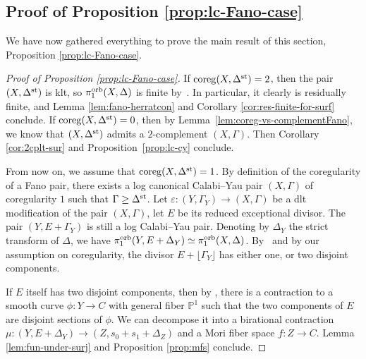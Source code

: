 \documentclass{amsart}
\newcommand{\pp}{\mathbb{P}}
\theoremstyle{definition}
\theoremstyle{remark}
\numberwithin{equation}{section}
\begin{document}
\subsection{Proof of Proposition \ref{prop:lc-Fano-case}}\label{subsec:lc-Fano-surf}
We have now gathered everything to prove the main result of this section, Proposition \ref{prop:lc-Fano-case}.


\begin{proof}[Proof of Proposition \ref{prop:lc-Fano-case}]
If ${\rm coreg}(X,\Delta^{\rm st})=2$, then the pair $(X,\Delta^{\rm st})$ is klt, so $\pi_1^{\rm orb}(X,\Delta)$ is finite by~\cite[Theorem 2]{Bra20}. In particular, it clearly is residually finite, and Lemma \ref{lem:fano-herratcon} and Corollary \ref{cor:res-finite-for-surf} conclude. If ${\rm coreg}(X,\Delta^{\rm st})=0$, then by Lemma~\ref{lem:coreg-vs-complementFano}, we know that $(X,\Delta^{\rm st})$ admits a $2$-complement $(X,\Gamma)$. Then Corollary \ref{cor:2cplt-sur} and Proposition~\ref{prop:lc-cy} conclude.

From now on, we assume that ${\rm coreg}(X,\Delta^{\rm st})=1$.
By definition of the coregularity of a Fano pair, there exists a log canonical Calabi--Yau pair $(X,\Gamma)$ of coregularity $1$ such that $\Gamma\ge \Delta^{\rm st}$. 
Let $\varepsilon:(Y,\Gamma_Y)\rightarrow (X,\Gamma)$ be a dlt modification of the pair $(X,\Gamma)$, let $E$ be its reduced exceptional divisor.
The pair $(Y,E+\Gamma_Y)$ is still a log Calabi--Yau pair. Denoting by $\Delta_Y$ the strict transform of $\Delta$, we have $\pi_1^{\rm orb}(Y,E+\Delta_Y) \simeq \pi_1^{\rm orb}(X,\Delta)$. 
By~\cite[Theorem 1.1]{FS20} and by our assumption on coregularity, the divisor $E+\lfloor\Gamma_Y\rfloor$ has either one, or two disjoint components.

If $E$ itself has two disjoint components, then by \cite[Proposition 3.3.2]{Pro01c}, there is a contraction to a smooth curve $\phi:Y\to C$ with general fiber $\pp^1$ such that the two components of $E$ are disjoint sections of $\phi$. We can decompose it into a birational contraction $\mu: (Y,E+\Delta_Y)\to (Z,s_0+s_1+\Delta_Z)$ and a Mori fiber space $f:Z\to C$. Lemma \ref{lem:fun-under-surj} and Proposition \ref{prop:mfs} conclude.

\end{proof}
\end{document}

